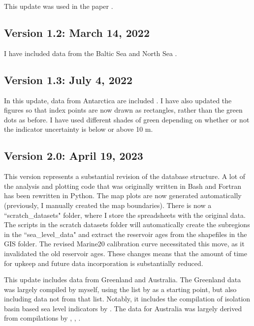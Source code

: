 This update was used in the paper \citet{GowanEta2022}.

\subsection{Version 1.2: March 14, 2022}

I have included data from the Baltic Sea \citep{RosentauEtal2021} and North Sea \citep{VinkEtal2007}.

\subsection{Version 1.3: July 4, 2022}

In this update, data from Antarctica are included \citep{BriggsTarasov2013,IshiwaEtal2021}. I have also updated the figures so that index points are now drawn as rectangles, rather than the green dots as before. I have used different shades of green depending on whether or not the indicator uncertainty is below or above 10 m.

\subsection{Version 2.0: April 19, 2023}

This version represents a substantial revision of the database structure. A lot of the analysis and plotting code that was originally written in Bash and Fortran has been rewritten in Python. The map plots are now generated automatically (previously, I manually created the map boundaries). There is now a ``scratch\_datasets" folder, where I store the spreadsheets with the original data. The scripts in the scratch datasets folder will automatically create the subregions in the ``sea\_level\_data" and extract the reservoir ages from the shapefiles in the GIS folder. The revised Marine20 calibration curve necessitated this move, as it invalidated the old reservoir ages. These changes means that the amount of time for upkeep and future data incorporation is substantially reduced.

This update includes data from Greenland and Australia. The Greenland data was largely compiled by myself, using the list by \citet{LecavalierEtal2014} as a starting point, but also including data not from that list. Notably, it includes the compilation of isolation basin based sea level indicators by \citet{LongEtal2011}. The data for Australia was largely derived from compilations by \citet{LewisEtal2013}, \citet{SlossEtal2007}, \citet{BelperioEtal2002}.
